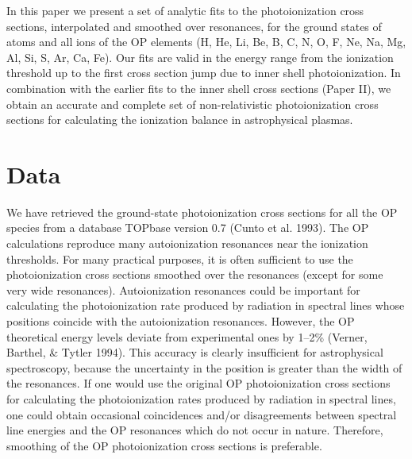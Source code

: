 In this paper we present a set of analytic fits to the photoionization cross 
sections, interpolated and smoothed over resonances, for the ground states of 
atoms and all ions of the OP elements (H, He, Li, Be, B, C, N, O, F, Ne, Na, 
Mg, Al, Si, S, Ar, Ca, Fe). Our fits are valid in the energy range from the 
ionization threshold up to the first cross section jump due to inner shell 
photoionization. In combination with the earlier fits to the inner shell cross 
sections (Paper II), we obtain an accurate and complete set of 
non-relativistic photoionization cross sections for calculating the ionization 
balance in astrophysical plasmas.  

\section{Data}

We have retrieved the ground-state photoionization cross sections for all
the OP species from a database TOPbase version 0.7 
(Cunto et al. 1993). 
The OP calculations reproduce 
many autoionization resonances near the ionization thresholds. For many 
practical 
purposes, it is often sufficient to use the photoionization cross sections
smoothed over the resonances (except for some very wide resonances). 
Autoionization
resonances 
could be important for calculating the photoionization rate produced by
radiation in spectral lines whose positions coincide with the autoionization
resonances. 
However, the OP theoretical energy levels deviate from experimental ones
by 1--2\%  (Verner, Barthel, \& Tytler 1994). 
This accuracy is clearly insufficient for
astrophysical spectroscopy, because the uncertainty in the position is greater
than the width of the resonances.
If one would use the original OP photoionization cross 
sections for calculating the photoionization rates produced by radiation in 
spectral lines, one could obtain occasional coincidences and/or disagreements
between spectral line energies and the OP resonances which do not occur in 
nature. Therefore, smoothing of
the OP photoionization cross sections is preferable.

